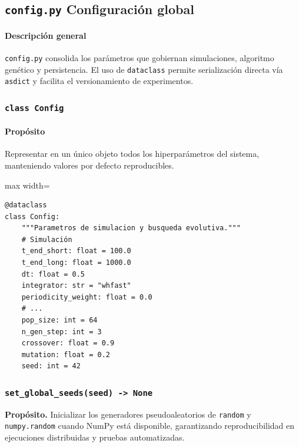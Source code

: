 
\subsection{\texttt{config.py} \- Configuración global}
\paragraph{Descripción general}
\texttt{config.py} consolida los parámetros que gobiernan simulaciones, algoritmo genético y persistencia. El uso de \texttt{dataclass} permite serialización directa vía \texttt{asdict} y facilita el versionamiento de experimentos.

\subsubsection{\texttt{class Config}}
\paragraph{Propósito} Representar en un único objeto todos los hiperparámetros del sistema, manteniendo valores por defecto reproducibles.

\begin{listing}[H]
\caption{Fragmento principal de \texttt{Config}}
\begin{adjustbox}{max width=\textwidth}
\begin{minipage}{\textwidth}
\begin{verbatim}
@dataclass
class Config:
    """Parametros de simulacion y busqueda evolutiva."""
    # Simulación
    t_end_short: float = 100.0
    t_end_long: float = 1000.0
    dt: float = 0.5
    integrator: str = "whfast"
    periodicity_weight: float = 0.0
    # ...
    pop_size: int = 64
    n_gen_step: int = 3
    crossover: float = 0.9
    mutation: float = 0.2
    seed: int = 42
\end{verbatim}
\end{minipage}
\end{adjustbox}
\end{listing}

\subsubsection*{\texttt{set\_global\_seeds(seed) -> None}}
\textbf{Propósito.} Inicializar los generadores pseudoaleatorios de \texttt{random} y \texttt{numpy.random} cuando NumPy está disponible, garantizando reproducibilidad en ejecuciones distribuidas y pruebas automatizadas.

